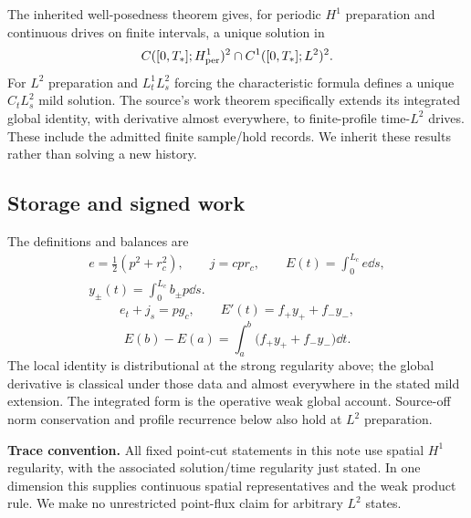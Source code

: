The inherited well-posedness theorem gives, for periodic $H^1$ preparation and continuous drives on finite intervals, a unique solution in
\begin{equation}\label{eq:regularity}
 C([0,T_*];H^1_{\rm per})^2\cap C^1([0,T_*];L^2)^2.
\end{equation}
For $L^2$ preparation and $L^1_tL^2_s$ forcing the characteristic formula defines a unique $C_tL^2_s$ mild solution. The source's work theorem specifically extends its integrated global identity, with derivative almost everywhere, to finite-profile time-$L^2$ drives. These include the admitted finite sample/hold records. We inherit these results rather than solving a new history.

\subsection{Storage and signed work}\label{sec:workaccount}
The definitions and balances are
\begin{equation}\label{eq:account}
\begin{gathered}
 e=\tfrac12(p^2+r_c^2),\qquad j=cpr_c,\qquad
 E(t)=\int_0^{L_c}e\dd s,\\
 y_\pm(t)=\int_0^{L_c}b_\pm p\dd s.
\end{gathered}
\end{equation}
\begin{equation}\label{eq:balance}
 e_t+j_s=pg_c,\qquad E'(t)=f_+y_++f_-y_-,
\end{equation}
\begin{equation}\label{eq:integrated}
 E(b)-E(a)=\int_a^b\bigl(f_+y_++f_-y_-\bigr)\dd t.
\end{equation}
The local identity is distributional at the strong regularity above; the global derivative is classical under those data and almost everywhere in the stated mild extension. The integrated form is the operative weak global account. Source-off norm conservation and profile recurrence below also hold at $L^2$ preparation.

\textbf{Trace convention.} All fixed point-cut statements in this note use spatial $H^1$ regularity, with the associated solution/time regularity just stated. In one dimension this supplies continuous spatial representatives and the weak product rule. We make no unrestricted point-flux claim for arbitrary $L^2$ states.

